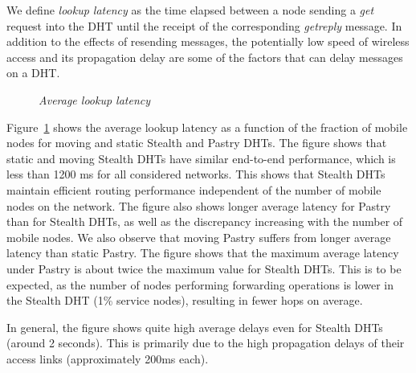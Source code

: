 \documentclass[conference]{IEEEtran}
\begin{document}
We define {\em lookup latency} as the time elapsed between a node
sending a {\em get} request into the DHT until the receipt of the
corresponding {\em getreply} message. In addition to the effects of
resending messages, the potentially low speed of wireless access and
its propagation delay are some of the factors that can delay
messages on a DHT.

\begin{figure}[htb]
\centering {}
\caption{\em Average lookup latency} \label{fig:latency}
\end{figure}


Figure~\ref{fig:latency} shows the average lookup latency as a
function of the fraction of mobile nodes for moving and static
Stealth and Pastry DHTs. The figure shows that static and moving
Stealth DHTs have similar end-to-end performance, which is less than
1200 ms for all considered networks. This shows that Stealth DHTs
maintain efficient routing performance independent of the number of
mobile nodes on the network.  The figure also shows longer average
latency for Pastry than for Stealth DHTs, as well as the discrepancy
increasing with the number of mobile nodes. We also observe that
moving Pastry suffers from longer average latency than static
Pastry. The figure shows that the maximum average latency under
Pastry is about twice the maximum value for Stealth DHTs. This is to
be expected, as the number of nodes performing forwarding operations
is lower in the Stealth DHT (1\% service nodes), resulting in fewer
hops on average.


In general, the figure shows quite  high average delays even for
Stealth DHTs (around 2 seconds). This is primarily due to the high
propagation delays of their access links (approximately 200ms each).
\end{document}
